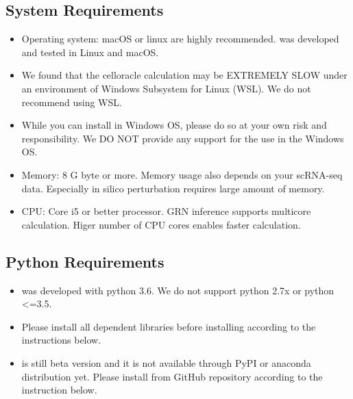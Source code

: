 \documentclass[letterpaper,10pt,english]{sphinxmanual}
\begin{document}
\subsection{System Requirements}
\label{\detokenize{installation/index:system-requirements}}\begin{itemize}
\item {} 
Operating system: macOS or linux are highly recommended.  was developed and tested in Linux and macOS.

\item {} 
We found that the celloracle calculation may be EXTREMELY SLOW under an environment of Windows Subsystem for Linux (WSL). We do not recommend using WSL.

\item {} 
While you can install  in Windows OS, please do so at your own risk and responsibility. We DO NOT provide any support for the use in the Windows OS.

\item {} 
Memory: 8 G byte or more.  Memory usage also depends on your scRNA-seq data. Especially in silico perturbation requires large amount of memory.

\item {} 
CPU: Core i5 or better processor. GRN inference supports multicore calculation. Higer number of CPU cores enables faster calculation.

\end{itemize}


\subsection{Python Requirements}
\label{\detokenize{installation/index:python-requirements}}\begin{itemize}
\item {} 
 was developed with python 3.6. We do not support python 2.7x or python \textless{}=3.5.

\item {} 
Please install all dependent libraries before installing  according to the instructions below.

\item {} 
  is still beta version and it is not available through PyPI or anaconda distribution yet. Please install  from GitHub repository according to the instruction below.

\end{itemize}
\end{document}

